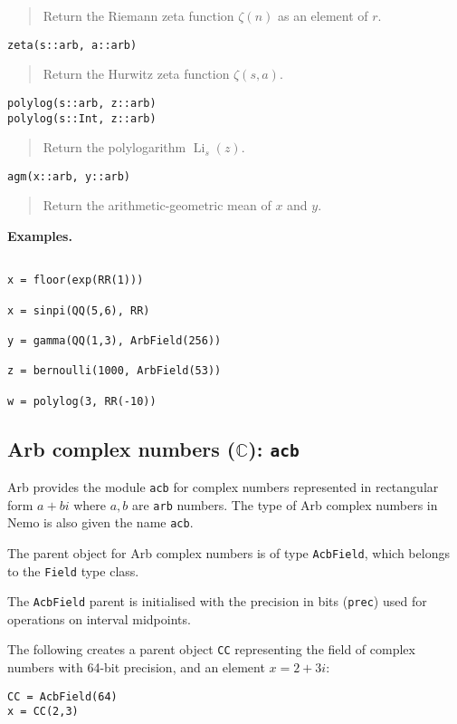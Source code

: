 \documentclass[a4paper,10pt]{article}
\newcommand{\C}{\mathbb{C}}
\newcommand{\code}{\lstinline}
\newcommand{\desc}[1]{\vspace{-3mm}\begin{quote}#1\end{quote}}
\begin{document}
{{\desc{Return the Riemann zeta function $\zeta(n)$ as an element of $r$.}

\begin{lstlisting}
zeta(s::arb, a::arb)
\end{lstlisting}

\desc{Return the Hurwitz zeta function $\zeta(s,a)$.}

\begin{lstlisting}
polylog(s::arb, z::arb)
polylog(s::Int, z::arb)
\end{lstlisting}

\desc{Return the polylogarithm $\operatorname{Li}_s(z)$.}

\begin{lstlisting}
agm(x::arb, y::arb)
\end{lstlisting}

\desc{Return the arithmetic-geometric mean of $x$ and $y$.}

\textbf{Examples.}

\begin{lstlisting}

x = floor(exp(RR(1)))

x = sinpi(QQ(5,6), RR)

y = gamma(QQ(1,3), ArbField(256))

z = bernoulli(1000, ArbField(53))

w = polylog(3, RR(-10))

\end{lstlisting}

\subsection{Arb complex numbers ($\C$): \code|acb|}

Arb provides the module \code{acb} for complex numbers represented
in rectangular form $a+bi$ where $a,b$ are \code{arb} numbers.
The type of Arb complex numbers in Nemo is also given the name \code{acb}.

The parent object for Arb complex numbers is of type \code{AcbField}, which
belongs to the \code{Field} type class.

The \code{AcbField} parent is initialised with the precision in bits (\code{prec})
used for operations on interval midpoints.

The following creates a parent object \code{CC} representing
the field of complex numbers with 64-bit precision, and an
element $x = 2+3i$:

\begin{lstlisting}
CC = AcbField(64)
x = CC(2,3)
\end{lstlisting}

}}
\end{document}
